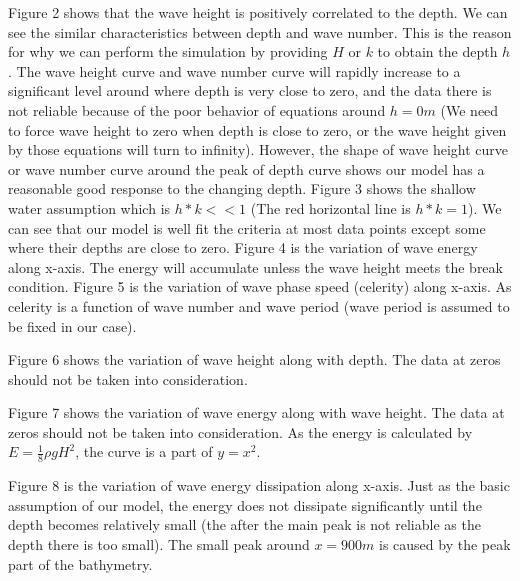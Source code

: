 %
Figure 2 shows that the wave height is positively correlated to the depth. We can see the similar characteristics between depth and wave number. This is the reason for why we can perform the simulation by providing ${H}$ or ${k}$ to obtain the depth ${h}$. The wave height curve and wave number curve will rapidly increase to a significant level around where depth is very close to zero, and the data there is not reliable because of the poor behavior of equations around $h=0 m$ (We need to force wave height to zero when depth is close to zero, or the wave height given by those equations will turn to infinity). However, the shape of wave height curve or wave number curve around the peak of depth curve shows our model has a reasonable good response to the changing depth.
Figure 3 shows the shallow water assumption which is $h*k<<1$ (The red horizontal line is $h*k=1$). We can see that our model is well fit the criteria at most data points except some where their depths are close to zero.
Figure 4 is the variation of wave energy along x-axis. The energy will accumulate unless the wave height meets the break condition.
Figure 5 is the variation of wave phase speed (celerity) along x-axis. As celerity is a function of wave number and wave period (wave period is assumed to be fixed in our case). 

Figure 6 shows the variation of wave height along with depth. The data at zeros should not be taken into consideration.

Figure 7 shows the variation of wave energy along with wave height. The data at zeros should not be taken into consideration. As the energy is calculated by $E=\frac{1}{8}\rho g H^2$, the curve is a part of $y=x^2$.

Figure 8 is the variation of wave energy dissipation along x-axis. Just as the basic assumption of our model, the energy does not dissipate significantly until the depth becomes relatively small (the after the main peak is not reliable as the depth there is too small). The small peak around $x=900 m$ is caused by the peak part of the bathymetry.



